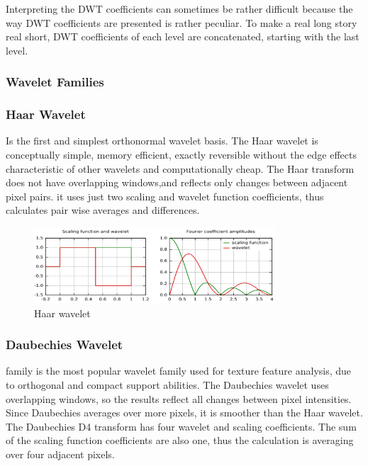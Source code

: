 \documentclass[12pt, a4paper, twoside]{report}
\begin{document}
Interpreting the DWT coefficients can sometimes be rather difficult because the way DWT coefficients are presented is rather peculiar. To make a real long story real short, DWT coefficients of each level are concatenated, starting with the last level.

\subsubsection{Wavelet Families}
\subsubsection{Haar Wavelet}
Is the first and simplest orthonormal wavelet basis. The Haar wavelet is conceptually simple, memory efficient, exactly reversible without the edge effects characteristic of other wavelets and computationally cheap. The Haar transform does not have overlapping windows,and reflects only changes between adjacent pixel pairs. it uses just two scaling and wavelet function coefficients, thus calculates pair wise averages and differences.
\begin{figure}[!h]
	\centering
	\includegraphics[width=0.8\textwidth]
	{images/chapter3/haar-wavelet}
	\caption{Haar wavelet}
	\label{fig:haar-wavelet}
\end{figure}

\subsubsection{Daubechies Wavelet}
family is the most popular wavelet family used for texture feature analysis, due to orthogonal and compact support abilities. The Daubechies wavelet uses overlapping windows, so the results reflect all changes between pixel intensities. Since Daubechies averages over more pixels, it is smoother than the Haar wavelet. The Daubechies D4 transform has four wavelet and scaling coefficients. The sum of the scaling function coefficients are also one, thus the calculation is averaging over four adjacent pixels.
\end{document}
